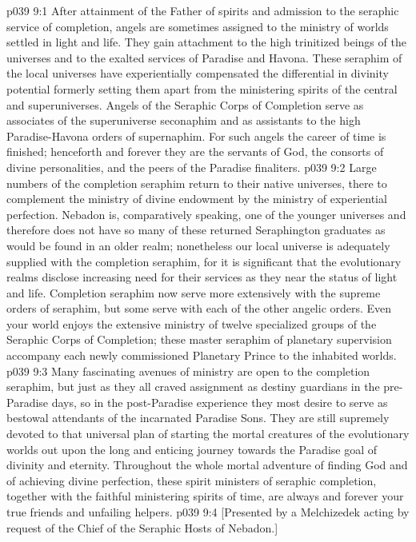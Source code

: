 \vs p039 9:1 After attainment of the Father of spirits and admission to the seraphic service of completion, angels are sometimes assigned to the ministry of worlds settled in light and life. They gain attachment to the high trinitized beings of the universes and to the exalted services of Paradise and Havona. These seraphim of the local universes have experientially compensated the differential in divinity potential formerly setting them apart from the ministering spirits of the central and superuniverses. Angels of the Seraphic Corps of Completion serve as associates of the superuniverse seconaphim and as assistants to the high Paradise\hyp{}Havona orders of supernaphim. For such angels the career of time is finished; henceforth and forever they are the servants of God, the consorts of divine personalities, and the peers of the Paradise finaliters.
\vs p039 9:2 Large numbers of the completion seraphim return to their native universes, there to complement the ministry of divine endowment by the ministry of experiential perfection. Nebadon is, comparatively speaking, one of the younger universes and therefore does not have so many of these returned Seraphington graduates as would be found in an older realm; nonetheless our local universe is adequately supplied with the completion seraphim, for it is significant that the evolutionary realms disclose increasing need for their services as they near the status of light and life. Completion seraphim now serve more extensively with the supreme orders of seraphim, but some serve with each of the other angelic orders. Even your world enjoys the extensive ministry of twelve specialized groups of the Seraphic Corps of Completion; these master seraphim of planetary supervision accompany each newly commissioned Planetary Prince to the inhabited worlds.
\vs p039 9:3 Many fascinating avenues of ministry are open to the completion seraphim, but just as they all craved assignment as destiny guardians in the pre\hyp{}Paradise days, so in the post\hyp{}Paradise experience they most desire to serve as bestowal attendants of the incarnated Paradise Sons. They are still supremely devoted to that universal plan of starting the mortal creatures of the evolutionary worlds out upon the long and enticing journey towards the Paradise goal of divinity and eternity. Throughout the whole mortal adventure of finding God and of achieving divine perfection, these spirit ministers of seraphic completion, together with the faithful ministering spirits of time, are always and forever your true friends and unfailing helpers.
\vsetoff
\vs p039 9:4 [Presented by a Melchizedek acting by request of the Chief of the Seraphic Hosts of Nebadon.]
